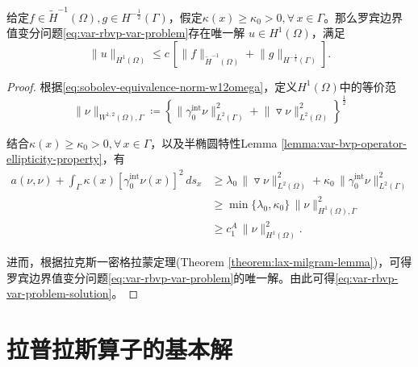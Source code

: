 \begin{theorem}[罗宾边界值变分问题的唯一解]
  给定$f \in \widetilde{H}^{-1}(\Omega), g\in H^{-\frac{1}{2}}(\Gamma)$，假定$\kappa(x) \ge \kappa_{0} > 0, \forall \, x \in \Gamma$。那么罗宾边界值变分问题\eqref{eq:var-rbvp-var-problem}存在唯一解
  $u \in H^{1}(\Omega)$，满足
  \begin{equation}
    \label{eq:var-rbvp-var-problem-solution}
    \big\| u \big\|_{H^{1}(\Omega)} \le c \,
    \left[
    \big\| f \big\|_{\widetilde{H}^{-1} (\Omega)}
    + \big\| g \big\|_{H^{-\frac{1}{2}}(\Gamma)}
    \right].
  \end{equation}
\end{theorem}
\begin{proof}
  根据\eqref{eq:sobolev-equivalence-norm-w12omega}，定义$H^{1}(\Omega)$中的等价范
  \begin{equation*}
    \big\| \nu \big\|_{W^{1,2}(\Omega), \Gamma} \coloneqq
    \left\{
    \big\| \gamma_{0}^{\text{int}} \nu \big\|_{L^2(\Gamma)}^2
    + \big\| \triangledown \nu \big\|_{L^{2}(\Omega)}^2
    \right\}^{\frac{1}{2}}
  \end{equation*}

  结合$\kappa(x) \ge \kappa_{0} > 0, \forall \, x \in \Gamma$，以及半椭圆特性Lemma \ref{lemma:var-bvp-operator-ellipticity-property}，有
  \begin{equation*}
    \begin{split}
      a(\nu,\nu) + \int_{\Gamma} \kappa(x)
      \left[
      \gamma_{0}^{\text{int}} \nu(x)
      \right]^2 \, d s_x
      & \ge
      \lambda_{0} \,
      \big\| \triangledown \nu \big\|_{L^{2}(\Omega)}^{2}
      + \kappa_{0} \, \big\| \gamma_{0}^{\text{int}} \nu \big\|_{L^{2}(\Gamma)}^2 \\
      & \ge
      \min \{ \lambda_0, \kappa_0 \} \,
      \big\| \nu \big\|_{H^{1}(\Omega), \Gamma}^2 \\
      & \ge c_{1}^{A} \, \big\| \nu \big\|_{H^{1}(\Omega)}^2.
    \end{split}
  \end{equation*}

进而，根据拉克斯一密格拉蒙定理(Theorem \ref{theorem:lax-milgram-lemma})，可得罗宾边界值变分问题\eqref{eq:var-rbvp-var-problem}的唯一解。由此可得\eqref{eq:var-rbvp-var-problem-solution}。
\end{proof}


\section{拉普拉斯算子的基本解}
\label{bvp-laplace-fund-solutions}

